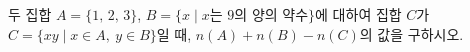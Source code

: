 두 집합 $A=\{1,\,2,\,3\}$, $B=\{x \mid x$는 $9$의 양의 약수$\}$에 대하여 집합 $C$가 $C=\{xy \mid x\in A,\ y\in B\}$일 때, $n(A)+n(B)-n(C)$의 값을 구하시오.
